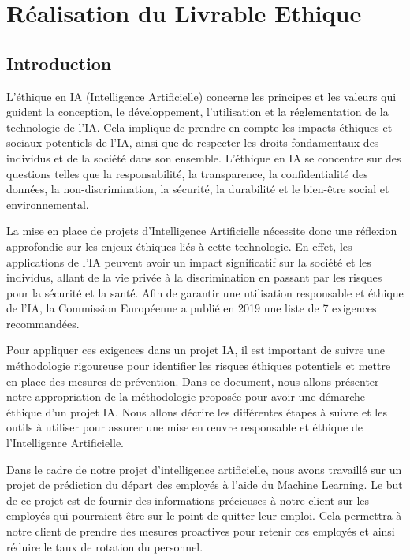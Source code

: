 \section{Réalisation du Livrable Ethique}
\subsection{Introduction}
L'éthique en IA (Intelligence Artificielle) concerne les principes et les valeurs qui guident la conception, le développement, l'utilisation et la réglementation de la technologie de l'IA. Cela implique de prendre en compte les impacts éthiques et sociaux potentiels de l'IA, ainsi que de respecter les droits fondamentaux des individus et de la société dans son ensemble. L'éthique en IA se concentre sur des questions telles que la responsabilité, la transparence, la confidentialité des données, la non-discrimination, la sécurité, la durabilité et le bien-être social et environnemental. 

La mise en place de projets d'Intelligence Artificielle nécessite donc une réflexion approfondie sur les enjeux éthiques liés à cette technologie. En effet, les applications de l'IA peuvent avoir un impact significatif sur la société et les individus, allant de la vie privée à la discrimination en passant par les risques pour la sécurité et la santé. Afin de garantir une utilisation responsable et éthique de l'IA, la Commission Européenne a publié en 2019 une liste de 7 exigences recommandées.  

Pour appliquer ces exigences dans un projet IA, il est important de suivre une méthodologie rigoureuse pour identifier les risques éthiques potentiels et mettre en place des mesures de prévention. Dans ce document, nous allons présenter notre appropriation de la méthodologie proposée pour avoir une démarche éthique d'un projet IA. Nous allons décrire les différentes étapes à suivre et les outils à utiliser pour assurer une mise en œuvre responsable et éthique de l'Intelligence Artificielle. 

Dans le cadre de notre projet d'intelligence artificielle, nous avons travaillé sur un projet de prédiction du départ des employés à l'aide du Machine Learning. Le but de ce projet est de fournir des informations précieuses à notre client sur les employés qui pourraient être sur le point de quitter leur emploi. Cela permettra à notre client de prendre des mesures proactives pour retenir ces employés et ainsi réduire le taux de rotation du personnel. 

\newpage
